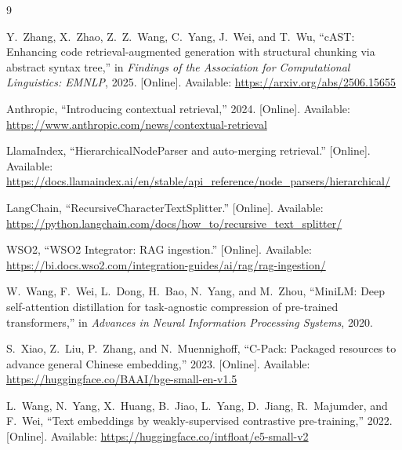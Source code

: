 \documentclass[conference]{IEEEtran}
\begin{document}
\begin{thebibliography}{9}

Y.~Zhang, X.~Zhao, Z.~Z.~Wang, C.~Yang, J.~Wei, and T.~Wu,
``cAST: Enhancing code retrieval-augmented generation with structural chunking via abstract syntax tree,''
in \emph{Findings of the Association for Computational Linguistics: EMNLP}, 2025.
[Online]. Available: \url{https://arxiv.org/abs/2506.15655}

Anthropic, ``Introducing contextual retrieval,'' 2024.
[Online]. Available: \url{https://www.anthropic.com/news/contextual-retrieval}

LlamaIndex, ``HierarchicalNodeParser and auto-merging retrieval.''
[Online]. Available: \url{https://docs.llamaindex.ai/en/stable/api_reference/node_parsers/hierarchical/}

LangChain, ``RecursiveCharacterTextSplitter.''
[Online]. Available: \url{https://python.langchain.com/docs/how_to/recursive_text_splitter/}

WSO2, ``WSO2 Integrator: RAG ingestion.''
[Online]. Available: \url{https://bi.docs.wso2.com/integration-guides/ai/rag/rag-ingestion/}

W.~Wang, F.~Wei, L.~Dong, H.~Bao, N.~Yang, and M.~Zhou,
``MiniLM: Deep self-attention distillation for task-agnostic compression of pre-trained transformers,''
in \emph{Advances in Neural Information Processing Systems}, 2020.

S.~Xiao, Z.~Liu, P.~Zhang, and N.~Muennighoff,
``C-Pack: Packaged resources to advance general Chinese embedding,'' 2023.
[Online]. Available: \url{https://huggingface.co/BAAI/bge-small-en-v1.5}

L.~Wang, N.~Yang, X.~Huang, B.~Jiao, L.~Yang, D.~Jiang, R.~Majumder, and F.~Wei,
``Text embeddings by weakly-supervised contrastive pre-training,'' 2022.
[Online]. Available: \url{https://huggingface.co/intfloat/e5-small-v2}

\end{thebibliography}
\end{document}
